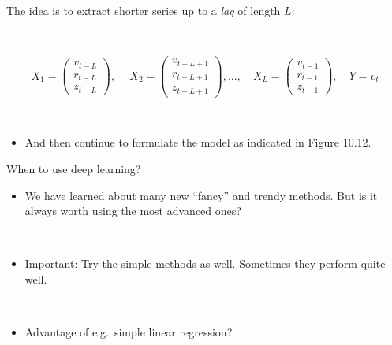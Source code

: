 \documentclass[
  10pt,
  ignorenonframetext,
]{beamer}
\providecommand{\tightlist}{%
  \setlength{\itemsep}{0pt}\setlength{\parskip}{0pt}}
\begin{document}
\begin{frame}
The idea is to extract shorter series up to a \emph{lag} of length
\(L\):

\(~\)

\[X_1 = \left( 
\begin{matrix}
v_{t-L}\\
r_{t-L}\\
z_{t-L}
\end{matrix}
\right), \ 
\quad X_2 = \left( 
\begin{matrix}
v_{t-L+1}\\
r_{t-L+1}\\
z_{t-L+1}
\end{matrix}
\right), ... ,
\quad 
X_L = \left( 
\begin{matrix}
v_{t-1}\\
r_{t-1}\\
z_{t-1}
\end{matrix}
\right), 
\quad 
Y = v_t\]

\(~\)

\begin{itemize}
\tightlist
\item
  And then continue to formulate the model as indicated in Figure 10.12.
\end{itemize}
\end{frame}

\begin{frame}{When to use deep learning?}
\protect\hypertarget{when-to-use-deep-learning}{}
\(~\)

\begin{itemize}
\tightlist
\item
  We have learned about many new ``fancy'' and trendy methods. But is it
  always worth using the most advanced ones?
\end{itemize}

\(~\)

\begin{itemize}
\tightlist
\item
  Important: Try the simple methods as well. Sometimes they perform
  quite well.
\end{itemize}

\(~\)

\begin{itemize}
\tightlist
\item
  Advantage of e.g.~simple linear regression?
\end{itemize}
\end{frame}
\end{document}
